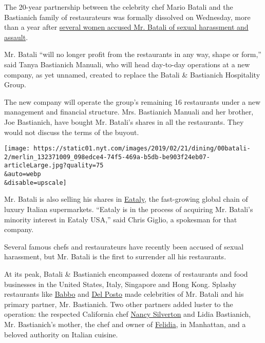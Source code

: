 The 20-year partnership between the celebrity chef Mario Batali and the
Bastianich family of restaurateurs was formally dissolved on Wednesday,
more than a year after
\href{https://www.nytimes.com/2017/12/11/dining/mario-batali-sexual-misconduct.html}{several
women accused Mr. Batali of sexual harassment and assault}.

Mr. Batali ``will no longer profit from the restaurants in any way,
shape or form,'' said Tanya Bastianich Manuali, who will head day-to-day
operations at a new company, as yet unnamed, created to replace the
Batali \& Bastianich Hospitality Group.

The new company will operate the group's remaining 16 restaurants under
a new management and financial structure. Mrs. Bastianich Manuali and
her brother, Joe Bastianich, have bought Mr. Batali's shares in all the
restaurants. They would not discuss the terms of the buyout.

\texttt{[image: https://static01.nyt.com/images/2019/02/21/dining/00batali-2/merlin\_132371009\_098edce4-74f5-469a-b5db-be903f24eb07-articleLarge.jpg?quality=75\\\&auto=webp\\\&disable=upscale]}

Mr. Batali is also selling his shares in
\href{https://www.eataly.com/}{Eataly}, the fast-growing global chain of
luxury Italian supermarkets. ``Eataly is in the process of acquiring Mr.
Batali's minority interest in Eataly USA,'' said Chris Giglio, a
spokesman for that company.

Several famous chefs and restaurateurs have recently been accused of
sexual harassment, but Mr. Batali is the first to surrender all his
restaurants.

At its peak, Batali \& Bastianich encompassed dozens of restaurants and
food businesses in the United States, Italy, Singapore and Hong Kong.
Splashy restaurants like
\href{https://www.nytimes.com/2017/04/04/dining/babbo-review-pete-wells.html}{Babbo}
and
\href{https://www.nytimes.com/2016/04/06/dining/del-posto-restaurant-luxury.html}{Del
Posto} made celebrities of Mr. Batali and his primary partner, Mr.
Bastianich. Two other partners added luster to the operation: the
respected California chef
\href{https://la.eater.com/2017/12/12/16764984/mario-batali-sexual-harassment-nancy-silverton-reaction-statement-mozza-restaurant-group}{Nancy
Silverton} and Lidia Bastianich, Mr. Bastianich's mother, the chef and
owner of
\href{https://www.google.com/search?q=felidia+nyc\&oq=Felidia+ny\&aqs=chrome.0.0j69i57j0l4.2886j0j7\&sourceid=chrome\&ie=UTF-8}{Felidia},
in Manhattan, and a beloved authority on Italian cuisine.

